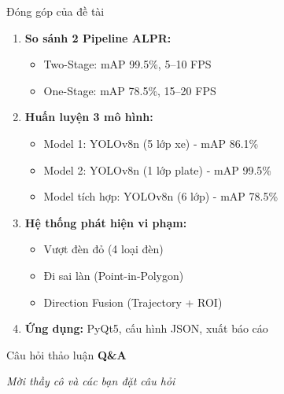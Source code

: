 \begin{frame}{Đóng góp của đề tài}
    \begin{enumerate}
        \item \textbf{So sánh 2 Pipeline ALPR:}
        \begin{itemize}
            \item Two-Stage: mAP 99.5\%, 5--10 FPS
            \item One-Stage: mAP 78.5\%, 15--20 FPS
        \end{itemize}

        \item \textbf{Huấn luyện 3 mô hình:}
        \begin{itemize}
            \item Model 1: YOLOv8n (5 lớp xe) - mAP 86.1\%
            \item Model 2: YOLOv8n (1 lớp plate) - mAP 99.5\%
            \item Model tích hợp: YOLOv8n (6 lớp) - mAP 78.5\%
        \end{itemize}

        \item \textbf{Hệ thống phát hiện vi phạm:}
        \begin{itemize}
            \item Vượt đèn đỏ (4 loại đèn)
            \item Đi sai làn (Point-in-Polygon)
            \item Direction Fusion (Trajectory + ROI)
        \end{itemize}

        \item \textbf{Ứng dụng:} PyQt5, cấu hình JSON, xuất báo cáo
    \end{enumerate}
\end{frame}

\begin{frame}{Câu hỏi thảo luận}
    \centering
    \Huge \textbf{Q\&A}

    \vspace{1em}
    \normalsize
    \textit{Mời thầy cô và các bạn đặt câu hỏi}
\end{frame}
